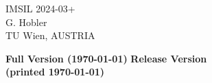 %
\begin{center}
{
\vspace*{4cm}
%
\titlefont
IMSIL 2024-03+ \\ \vspace*{3cm}
%
\authorfont
G. Hobler \\ \vspace*{1ex}
}
\vspace*{2.5cm}
%
TU Wien, AUSTRIA \\ \vspace*{1ex}

%
\ifprivate
   {\bf Full Version (\today)}
\else
   {\bf Release Version \\ (printed \today)}
\fi
%
\end{center}
